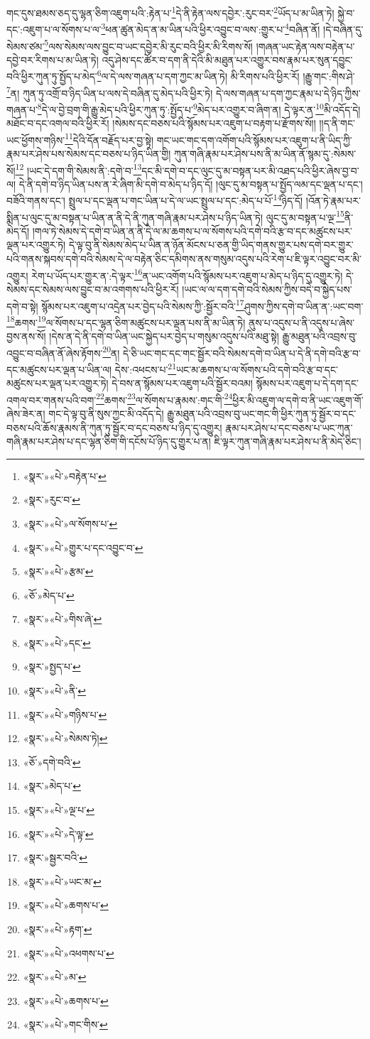 གང་དུས་ཐམས་ཅད་དུ་ལྷན་ཅིག་འཇུག་པའི་:རྟེན་པ་\footnote{«སྣར་»«པེ་»བརྟེན་པ་}དེ་ནི་རྟེན་ལས་དབྱེར་:རུང་བར་\footnote{«སྣར་»རུང་བ་}ཡོད་པ་མ་ཡིན་ཏེ། སྐྱེ་བ་དང་:འཇུག་པ་ལ་སོགས་པ་ལ་\footnote{«སྣར་»«པེ་»ལ་སོགས་པ་}ཕན་ཚུན་མེད་ན་མ་ཡིན་པའི་ཕྱིར་འབྱུང་བ་ལས་:གྱུར་པ་\footnote{«སྣར་»«པེ་»གྱུར་པ་དང་འབྱུང་བ་}བཞིན་ནོ། །དེ་བཞིན་དུ་སེམས་ཙམ་\footnote{«སྣར་»«པེ་»རྩམ་}ལས་སེམས་ལས་བྱུང་བ་ཡང་དབྱེར་མི་རུང་བའི་ཕྱིར་མི་རིགས་སོ། །གཞན་ཡང་རྟེན་ལས་བརྟེན་པ་དབྱེ་བར་རིགས་པ་མ་ཡིན་ཏེ། འདུ་ཤེས་དང་ཚོར་བ་དག་ནི་དེའི་མི་མཐུན་པར་འགྱུར་བས་རྣམ་པར་སུན་དབྱུང་བའི་ཕྱིར་ཀུན་ཏུ་སྤྱོད་པ་མེད་\footnote{«ཅོ་»མེད་པ་}ལ་དེ་ལས་གཞན་པ་དག་ཀྱང་མ་ཡིན་ཏེ། མི་རིགས་པའི་ཕྱིར་རོ། །རྒྱུ་གང་:གིས་ཤེ་\footnote{«སྣར་»«པེ་»གིས་ཞེ་}ན། ཀུན་ཏུ་འགྲོ་བ་ཉིད་ཡིན་པ་ལས་དེ་བཞིན་དུ་མེད་པའི་ཕྱིར་ཏེ། དེ་ལས་གཞན་པ་དག་ཀྱང་རྣམ་པ་དེ་ཉིད་ཀྱིས་གཞན་པ་\footnote{«སྣར་»«པེ་»དང་}དེ་ལ་བྱེ་བྲག་གི་རྒྱུ་མེད་པའི་ཕྱིར་ཀུན་ཏུ་:སྤྱོད་པ་\footnote{«སྣར་»སྤྱད་པ་}མེད་པར་འགྱུར་བ་ཞིག་ན། དེ་ལྟར་ན་\footnote{«སྣར་»«པེ་»ནི་}མི་འདོད་དེ། མཐོང་བ་དང་འགལ་བའི་ཕྱིར་རོ། །སེམས་དང་བཅས་པའི་སྙོམས་པར་འཇུག་པ་བརྟག་པ་རྫོགས་སོ།། །།ད་ནི་གང་ཡང་ཕྱོགས་གཉིས་\footnote{«སྣར་»«པེ་»གཉིས་པ་}དེའི་དོན་བརྗོད་པར་བྱ་སྟེ། གང་ཡང་གང་དག་འགོག་པའི་སྙོམས་པར་འཇུག་པ་ནི་ཡིད་ཀྱི་རྣམ་པར་ཤེས་པས་སེམས་དང་བཅས་པ་ཉིད་ཡིན་གྱི། ཀུན་གཞི་རྣམ་པར་ཤེས་པས་ནི་མ་ཡིན་ནོ་སྙམ་དུ་:སེམས་སོ།\footnote{«སྣར་»«པེ་»སེམས་ཏེ།} །ཡང་དེ་དག་གི་སེམས་ནི་:དགེ་བ་\footnote{«ཅོ་»དགེ་བའི་}དང་མི་དགེ་བ་དང་ལུང་དུ་མ་བསྟན་པར་མི་འཐད་པའི་ཕྱིར་ཞེས་བྱ་བ་ལ། དེ་ནི་དགེ་བ་ཉིད་ཡིན་པས་ན་རེ་ཞིག་མི་དགེ་བ་མེད་པ་ཉིད་དོ། །ལུང་དུ་མ་བསྟན་པ་སྤྱོད་ལམ་དང་ལྡན་པ་དང་། བཟོའི་གནས་དང་། སྤྲུལ་པ་དང་ལྡན་པ་གང་ཡིན་པ་དེ་ལ་ཡང་སྤྲུལ་པ་དང་:མེད་པ་པོ་\footnote{«སྣར་»མེད་པ་}ཉིད་དོ། །འོན་ཏེ་རྣམ་པར་སྨིན་པ་ལུང་དུ་མ་བསྟན་པ་ཡིན་ན་ནི་དེ་ནི་ཀུན་གཞི་རྣམ་པར་ཤེས་པ་ཉིད་ཡིན་ཏེ། ལུང་དུ་མ་བསྟན་པ་ལྔ་\footnote{«སྣར་»«པེ་»ལྔ་པ་}ནི་མེད་དོ། །གལ་ཏེ་སེམས་དེ་དགེ་བ་ཡིན་ན་ནི་དེ་ལ་མ་ཆགས་པ་ལ་སོགས་པའི་དགེ་བའི་རྩ་བ་དང་མཚུངས་པར་ལྡན་པར་འགྱུར་ཏེ། དེ་ལྟ་བུ་ནི་སེམས་མེད་པ་ཡིན་ན་ཉོན་མོངས་པ་ཅན་གྱི་ཡིད་གནས་གྱུར་པས་དགེ་བར་གྱུར་པའི་གནས་སྐབས་དགེ་བའི་སེམས་དེ་ལ་བརྟེན་ཅིང་དམིགས་ནས་གསུམ་འདུས་པའི་རེག་པ་ཇི་ལྟར་འབྱུང་བར་མི་འགྱུར། རེག་པ་ཡོད་པར་གྱུར་ན་:དེ་ལྟར་\footnote{«སྣར་»«པེ་»དེ་ལྟ་}ན་ཡང་འགོག་པའི་སྙོམས་པར་འཇུག་པ་མེད་པ་ཉིད་དུ་འགྱུར་ཏེ། དེ་སེམས་དང་སེམས་ལས་བྱུང་བ་མ་འགགས་པའི་ཕྱིར་རོ། །ཡང་ལ་ལ་དག་དགེ་བའི་སེམས་ཀྱིས་བདེ་བ་སྐྱེད་པས་དགེ་བ་སྟེ། སྙོམས་པར་འཇུག་པ་འདྲེན་པར་བྱེད་པའི་སེམས་ཀྱི་:སྦྱོར་བའི་\footnote{«སྣར་»སྦྱར་བའི་}ཤུགས་ཀྱིས་དགེ་བ་ཡིན་ན་:ཡང་བག་\footnote{«སྣར་»«པེ་»ཡང་མ་}ཆགས་\footnote{«སྣར་»«པེ་»ཆགས་པ་}ལ་སོགས་པ་དང་ལྷན་ཅིག་མཚུངས་པར་ལྡན་པས་ནི་མ་ཡིན་ཏེ། ནུས་པ་འདུས་པ་ནི་འདུས་པ་ཞེས་བྱས་ནས་སོ། །དེས་ན་དེ་ནི་དགེ་བ་ཡིན་ཡང་སྐྱེད་པར་བྱེད་པ་གསུམ་འདུས་པའི་མཐུ་སྟེ། རྒྱུ་མཐུན་པའི་འབྲས་བུ་འབྱུང་བ་བཞིན་ནོ་ཞེས་རྟོགས་\footnote{«སྣར་»«པེ་»རྟག་}ན། དེ་ཅི་ཡང་གང་དང་གང་སྦྱོར་བའི་སེམས་དགེ་བ་ཡིན་པ་དེ་ནི་དགེ་བའི་རྩ་བ་དང་མཚུངས་པར་ལྡན་པ་ཡིན་ལ། དེས་:འཕངས་པ་\footnote{«སྣར་»«པེ་»འཕགས་པ་}ཡང་མ་ཆགས་པ་ལ་སོགས་པའི་དགེ་བའི་རྩ་བ་དང་མཚུངས་པར་ལྡན་པར་འགྱུར་ཏེ། དེ་བས་ན་སྙོམས་པར་འཇུག་པའི་སྦྱོར་བའམ། སྙོམས་པར་འཇུག་པ་དེ་དག་དང་འགལ་བར་གནས་པའི་བག་\footnote{«སྣར་»«པེ་»མ་}ཆགས་\footnote{«སྣར་»«པེ་»ཆགས་པ་}ལ་སོགས་པ་རྣམས་:གང་གི་\footnote{«སྣར་»«པེ་»གང་གིས་}ཕྱིར་མི་འཇུག་ལ་དགེ་བ་ནི་ཡང་འཇུག་གོ་ཞེས་ཟེར་ན། གང་དེ་ལྟ་བུ་ནི་སུས་ཀྱང་མི་འདོད་དེ། རྒྱུ་མཐུན་པའི་འབྲས་བུ་ཡང་གང་གི་ཕྱིར་ཀུན་ཏུ་སྦྱོར་བ་དང་བཅས་པའི་ཆོས་རྣམས་ནི་ཀུན་ཏུ་སྦྱོར་བ་དང་བཅས་པ་ཉིད་དུ་འགྱུར། རྣམ་པར་ཤེས་པ་དང་བཅས་པ་ཡང་ཀུན་གཞི་རྣམ་པར་ཤེས་པ་དང་ལྷན་ཅིག་གི་དངོས་པོ་ཉིད་དུ་གྱུར་པ་ན། ཇི་ལྟར་ཀུན་གཞི་རྣམ་པར་ཤེས་པ་ནི་མེད་ཅིང་། 